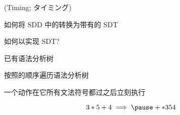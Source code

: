 \begin{frame}{}
  \begin{center}
     (Timing; タイミング)


    \vspace{0.30cm}
  \end{center}
\end{frame}

\begin{frame}{}
  \begin{center}
     如何将 SDD 中的转换为带有的 SDT

    \vspace{0.60cm}
    

    \vspace{0.60cm}
     如何以实现 SDT?
  \end{center}
\end{frame}

\begin{frame}{}
  \begin{center}
     已有语法分析树

    \vspace{0.50cm}

    \vspace{0.50cm}
    按照的顺序遍历语法分析树

    \pause
    \vspace{0.50cm}
     一个动作在它所有文法符号都过之后立刻执行
  \end{center}
\end{frame}

\begin{frame}{}
  \begin{center}
    \vspace{-0.50cm}
    \[
      3 \ast 5 + 4 \implies \pause + \ast 3 5 4
    \]
  \end{center}
\end{frame}

